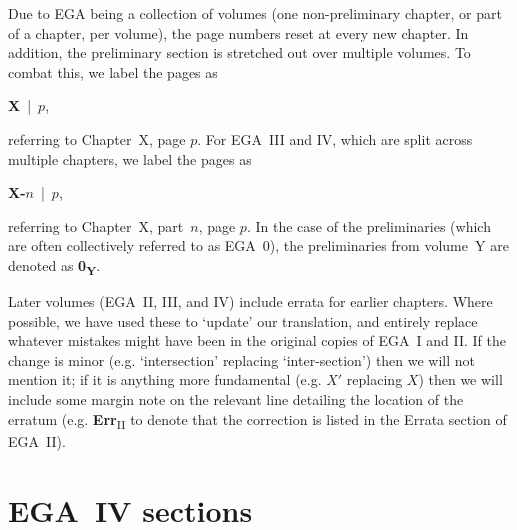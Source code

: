 Due to EGA being a collection of volumes (one non-preliminary chapter, or part of a chapter, per volume), the page numbers reset at every new chapter.
In addition, the preliminary section is stretched out over multiple volumes.
To combat this, we label the pages as
\begin{center}
  \textbf{X}~|~$p$,
\end{center}
referring to Chapter~X, page $p$.
For EGA~III and IV, which are split across multiple chapters, we label the pages as
\begin{center}
  \textbf{X-$n$}~|~$p$,
\end{center}
referring to Chapter~X, part~$n$, page $p$.
In the case of the preliminaries (which are often collectively referred to as EGA~0), the preliminaries from volume~Y are denoted as \textbf{0\textsubscript{Y}}.

\sectionbreak

Later volumes (EGA~II, III, and IV) include errata for earlier chapters.
Where possible, we have used these to `update' our translation, and entirely replace whatever mistakes might have been in the original copies of EGA~I and II.
If the change is minor (e.g. `intersection' replacing `inter-section') then we will not mention it; if it is anything more fundamental (e.g. $X'$ replacing $X$) then we will include some margin note on the relevant line detailing the location of the erratum (e.g. \textbf{Err}\textsubscript{II} to denote that the correction is listed in the Errata section of EGA~II).

\section*{EGA~IV sections}
\label{section:what-ega4-sections}

